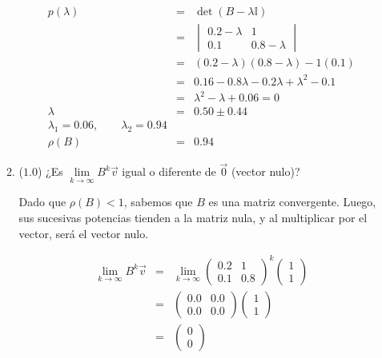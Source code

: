 \documentclass[12pt]{article}
\newcommand{\I}{\ensuremath{\mathbb{I}}}
\begin{document}
\begin{enumerate}[leftmargin=*,widest=9]
\begin{enumerate}[label=\alph*]
    \begin{eqnarray*}
    p(\lambda) &=& \det(B - \lambda\I)\\
    & = & \begin{vmatrix}
    0.2-\lambda & 1\\ 0.1 & 0.8-\lambda
    \end{vmatrix} \\
    & = & (0.2-\lambda)(0.8-\lambda) - 1(0.1)\\
    & = & 0.16 -0.8\lambda -0.2\lambda + \lambda^2 -0.1\\
    & = & \lambda^2 - \lambda + 0.06 = 0\\
    \lambda & = & 0.50 \pm 0.44\\
    \lambda_1 = 0.06, \qquad \lambda_2 = 0.94\\
    \rho(B) & = & 0.94
    \end{eqnarray*}
    
    
    \item (\(1.0\)) ¿Es \( \lim\limits_{k \rightarrow \infty}B^k \vec{v}\) igual o diferente de \(\vec{0}\) (vector nulo)?
    
    Dado que \(\rho(B) < 1\), sabemos que \(B\) es una matriz convergente. Luego, sus sucesivas potencias tienden a la matriz nula, y al multiplicar por el vector, será el vector nulo.
    
    \begin{eqnarray*}
    \lim\limits_{k \rightarrow \infty}B^k \vec{v} & = & \lim\limits_{k \rightarrow \infty}\begin{pmatrix}
    0.2 & 1 \\ 0.1 & 0.8
    \end{pmatrix}^k\begin{pmatrix}
    1 \\ 1
    \end{pmatrix} \\
    & = & \begin{pmatrix}
    0.0 & 0.0 \\ 0.0 & 0.0
    \end{pmatrix}\begin{pmatrix}
    1 \\ 1
    \end{pmatrix} \\
    & = & \begin{pmatrix}
    0 \\ 0
    \end{pmatrix}
    \end{eqnarray*}
    

\end{enumerate}
\end{enumerate}
\end{document}

